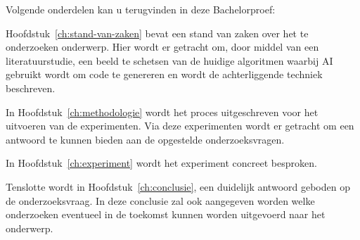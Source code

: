 Volgende onderdelen kan u terugvinden in deze Bachelorproef:

Hoofdstuk~\ref{ch:stand-van-zaken} bevat een stand van zaken over het te onderzoeken onderwerp. Hier wordt er getracht om, door middel van een literatuurstudie, een beeld te schetsen van de huidige algoritmen waarbij AI gebruikt wordt om code te genereren en wordt de achterliggende techniek beschreven.

In Hoofdstuk~\ref{ch:methodologie} wordt het proces uitgeschreven voor het uitvoeren van de experimenten. Via deze experimenten wordt er getracht om een antwoord te kunnen bieden aan de opgestelde onderzoeksvragen.

In Hoofdstuk~\ref{ch:experiment} wordt het experiment concreet besproken.

Tenslotte wordt in Hoofdstuk~\ref{ch:conclusie}, een duidelijk antwoord geboden op de onderzoeksvraag. In deze conclusie zal ook aangegeven worden welke onderzoeken eventueel in de toekomst kunnen worden uitgevoerd naar het onderwerp.